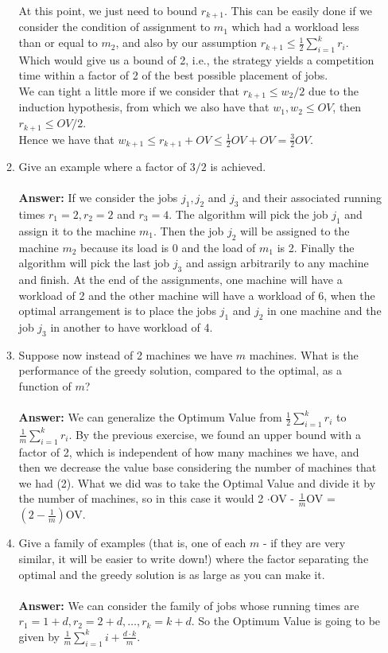 \documentclass[tikz, 12pt]{scrartcl}
\begin{document}
\begin{enumerate}
\begin{enumerate}
	At this point, we just need to bound $r_{k + 1}$. This can be easily done if we consider the condition of assignment to $m_1$ which had a workload less than or equal to $m_2$, and also by our assumption $r_{k + 1} \leq \frac{1}{2}\sum_{i = 1}^{k} r_i$. Which would give us a bound of 2, i.e., the strategy yields a competition time within a factor of 2 of the best possible placement of jobs.\\
	We can tight a little more  if we consider that $r_{k + 1} \leq  w_2 / 2$ due to the induction hypothesis, from which we also have that $w_1, w_2 \leq OV$, then $r_{k + 1} \leq OV /2$.\\
	Hence we have that $w_{k + 1} \leq r_{k+1} + OV \leq \frac{1}{2}OV + OV = \frac{3}{2}OV$.
	
	
	\item Give an example where a factor of $3/2$ is achieved. \\
	\\
	\textbf{Answer: }  If we consider the jobs $j_1, j_2$ and $j_3$ and their associated running times $r_1 = 2, r_2 = 2$ and $r_3 = 4$. The algorithm will pick the job $j_1$ and assign it to the machine $m_1$. Then the job $j_2$ will be assigned to the machine $m_2$ because its load is 0 and the load of $m_1$ is 2. Finally the algorithm will pick the last job $j_3$ and assign arbitrarily to any machine and finish. At the end of the assignments, one machine will have a workload of 2 and the other machine will have a workload of 6, when the optimal arrangement is to place the jobs $j_1$ and $j_2$ in one machine and the job $j_3$ in another to have workload of 4.
	
	
	\item Suppose now instead of 2 machines we have $m$ machines. What is the performance of the greedy solution, compared to the optimal, as a function of $m$? \\
	\\
	\textbf{Answer: } We can generalize the Optimum Value from $\frac{1}{2}\sum_{i = 1}^{k} r_i$ to $\frac{1}{m}\sum_{i = 1}^{k} r_i$. By the previous exercise, we found an upper bound with a factor of 2, which is independent of how many machines we have, and then we decrease the value base considering the number of machines that we had (2). What we did was to take the Optimal Value and divide it by the number of machines, so in this case it would 2 $\cdot $OV - $\frac{1}{m}$OV = $\left(2- \frac{1}{m}\right)$OV.
	
	\item Give a family of examples (that is, one of each $m$ - if they are very similar, it will be easier to write down!) where the factor separating the optimal and the greedy solution is as large as you can make it.\\
	\\
	\textbf{Answer: } We can consider the family of jobs whose running times are $r_1 =1+ d, r_2 = 2 +  d, \ldots, r_k = k + d$. So the Optimum Value is going to be given by $\frac{1}{m}\sum_{i = 1}^{k} i + \frac{d \cdot k}{m}$.
	

\end{enumerate}
\end{enumerate}
\end{document}
